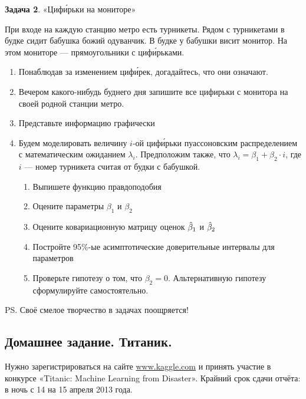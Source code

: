 \documentclass[12pt, a4paper]{article}
\begin{document}
\textbf{Задача 2}. «Циф\'{и}рьки на мониторе»

При входе на каждую станцию метро есть турникеты. Рядом с турникетами в будке сидит бабушка божий одуванчик. В будке у бабушки висит монитор. На этом мониторе — прямоугольники с циф\'{и}рьками.
\begin{enumerate}
\item Понаблюдав за изменением циф\'{и}рек, догадайтесь, что они означают.
\item Вечером какого-нибудь буднего дня запишите все цифирьки с монитора на своей родной станции метро.
\item Представьте информацию графически
\item Будем моделировать величину $i$-ой циф\'{и}рьки пуассоновским распределением с математическим ожиданием $\lambda_i$. Предположим также, что $\lambda_i=\beta_1+\beta_2 \cdot i$, где $i$ — номер турникета считая от будки с бабушкой.
\begin{enumerate}
\item Выпишете функцию правдоподобия
\item Оцените параметры $\beta_1$ и $\beta_2$
\item Оцените ковариационную матрицу оценок $\hat{\beta}_1$ и $\hat{\beta}_2$
\item Постройте 95\%-ые асимптотические доверительные интервалы для параметров
\item Проверьте гипотезу о том, что $\beta_2=0$. Альтернативную гипотезу сформулируйте самостоятельно.
\end{enumerate}
\end{enumerate}



PS. Своё смелое творчество в задачах поощряется!

\subsection{Домашнее задание. Титаник.}

Нужно зарегистрироваться на сайте \url{www.kaggle.com} и принять участие в конкурсе «Titanic: Machine Learning from Disaster». Крайний срок сдачи отчёта: в ночь с 14 на 15 апреля 2013 года.

\vspace{15pt}
\WhiteRoseLine
\vspace{15pt}
\end{document}

